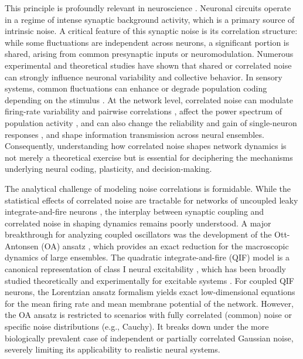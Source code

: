 \documentclass[aps,twocolumn,pre]{revtex4-2}
\begin{document}
This principle is profoundly relevant in neuroscience \cite{lampl1999synchronous,doiron2016mechanics}. Neuronal circuits operate in a regime of intense synaptic background activity, which is a primary source of intrinsic noise. A critical feature of this synaptic noise is its correlation structure: while some fluctuations are independent across neurons, a significant portion is shared, arising from common presynaptic inputs or neuromodulation. Numerous experimental and theoretical studies have shown that shared or correlated noise can strongly influence neuronal variability and collective behavior.
In sensory systems, common fluctuations can enhance or degrade population coding depending on the stimulus \cite{averbeck2006neural,moreno2014information}. At the network level, correlated noise can modulate firing-rate variability and pairwise correlations \cite{renart2010asynchronous}, affect the power spectrum of population activity \cite{de2007correlation}, and can also change the reliability and gain of single-neuron responses \cite{salinas2000impact}, and shape information transmission across neural ensembles.
Consequently, understanding how correlated noise shapes network dynamics is not merely a theoretical exercise but is essential for deciphering the mechanisms underlying neural coding, plasticity, and decision-making.

The analytical challenge of modeling noise correlations is formidable. While the statistical effects of correlated noise are tractable for networks of uncoupled leaky integrate-and-fire neurons \cite{lindner2005theory,tchumatchenko2010correlations}, the interplay between synaptic coupling and correlated noise in shaping dynamics remains poorly understood. A major breakthrough for analyzing coupled oscillators was the development of the Ott-Antonsen (OA) ansatz \cite{ott2008low}, which provides an exact reduction for the macroscopic dynamics of large ensembles. The quadratic integrate-and-fire (QIF) model is a canonical representation of class I neural excitability \cite{izhikevich2007dynamical,ermentrout1986parabolic}, which has been broadly studied theoretically and experimentally for excitable systems \cite{byrne2020next,rabuffo2021neuronal,di2018transition,pietras2023exact,goldobin2024discrete,ness2025validity,gerster2021patient,laing2015exact,jia2023bioelectrical}.
For coupled QIF neurons, the Lorentzian ansatz formalism \cite{montbrio2015macroscopic} yields exact low-dimensional equations for the mean firing rate and mean membrane potential of the network. However, the OA ansatz is restricted to scenarios with fully correlated (common) noise or specific noise distributions (e.g., Cauchy). It breaks down under the more biologically prevalent case of independent or partially correlated Gaussian noise, severely limiting its applicability to realistic neural systems.
\end{document}
